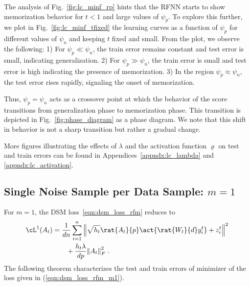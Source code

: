 The analysis of Fig.~\ref{fig:lc_minf_rp} hints that the RFNN starts to show memorization behavior for $t<1$ and large values of $\psi_p$. To explore this further, we plot in Fig.~\ref{fig:lc_minf_tfixed} the learning curves as a function of $\psi_p$ for different values of $\psi_n$ and keeping $t$ fixed and small.
From the plot, we observe the following: 1) For $\psi_p\ll\psi_n$, the train error remains constant and test error is small, indicating generalization. 2) For $\psi_p\gg\psi_n$, the train error is small and test error is high indicating the presence of memorization. 3) In the region $\psi_p\approx\psi_n$, the test error rises rapidly, signaling the onset of memorization.

Thus, $\psi_p=\psi_n$ acts as a crossover point at which the behavior of the score transitions from generalization phase to memorization phase. This transition is depicted in Fig.~\ref{fig:phase_diagram} as a phase diagram. We note that this shift in behavior is not a sharp transition but rather a gradual change.   

More figures illustrating the effects of $\lambda$ and the activation function $\varrho$ on test and train errors can be found in Appendices~\ref{appndx:lc_lambda} and \ref{appndx:lc_activation}.
\subsection{Single Noise Sample per Data Sample: $m=1$}
For $m=1$, the DSM loss~\eqref{eqn:dsm_loss_rfm} reduces to
\begin{align}\label{eqn:dsm_loss_rfm_m1}
    \cL^1(A_t) &= \frac{1}{dn}\sum_{i=1}^{n}{\norm{\sqrt{h_t}\rat{A_t}{p}\act{\rat{W_t}{d}y^t_i}+z^t_i}^2}\nonumber\\
    &\qquad +\frac{h_t\lambda}{dp}\norm{A_t}_F^2 \;.
\end{align}
The following theorem characterizes the test and train errors of minimizer of the loss given in (\ref{eqn:dsm_loss_rfm_m1}).

